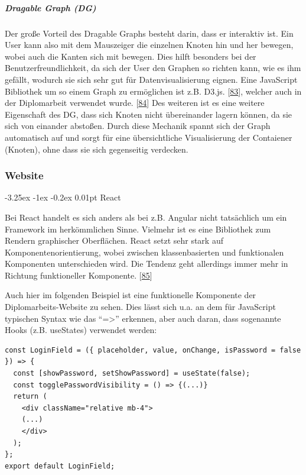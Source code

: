 \documentclass[
    headings=optiontotocandhead,%
    twoside,
    numbers=noenddot,%
    12pt, %
    titlepage, %
    parskip=full, %
    listof=leveldown, 
    numbers=noenddot, %
    a4paper,DIV=14,
    BCOR=15mm,
]{scrbook}
\makeatletter
\renewcommand\paragraph{\@startsection{paragraph}{4}{\z@}%
    {-3.25ex \@plus -1ex \@minus -0.2ex}%
    {0.01pt}%
    {\raggedsection\normalfont\sectfont\nobreak\size@paragraph}%
  }
\makeatother
\begin{document}
\hypertarget{dragable-graph-dg}{%
\subparagraph{Dragable Graph (DG)}\label{dragable-graph-dg}}

Der große Vorteil des Dragable Graphs besteht darin, dass er interaktiv
ist. Ein User kann also mit dem Mauszeiger die einzelnen Knoten hin und
her bewegen, wobei auch die Kanten sich mit bewegen. Dies hilft
besonders bei der Benutzerfreundlichkeit, da sich der User den Graphen
so richten kann, wie es ihm gefällt, wodurch sie sich sehr gut für
Datenvisualisierung eignen. Eine JavaScript Bibliothek um so einem Graph
zu ermöglichen ist z.B. D3.js.
{[}\protect\hyperlink{ref-D3js-Homepage}{83}{]}, welcher auch in der
Diplomarbeit verwendet wurde.
{[}\protect\hyperlink{ref-gpt-DragableGraph}{84}{]} Des weiteren ist es
eine weitere Eigenschaft des DG, dass sich Knoten nicht übereinander
lagern können, da sie sich von einander abstoßen. Durch diese Mechanik
spannt sich der Graph automatisch auf und sorgt für eine übersichtliche
Visualisierung der Contaiener (Knoten), ohne dass sie sich gegenseitig
verdecken.

\hypertarget{website}{%
\subsubsection{Website}\label{website}}

\hypertarget{react}{%
\paragraph{React}\label{react}}

Bei React handelt es sich anders als bei z.B. Angular nicht tatsächlich
um ein Framework im herkömmlichen Sinne. Vielmehr ist es eine Bibliothek
zum Rendern graphischer Oberflächen. React setzt sehr stark auf
Komponentenorientierung, wobei zwischen klassenbasierten und
funktionalen Komponenten unterschieden wird. Die Tendenz geht allerdings
immer mehr in Richtung funktioneller Komponente.
{[}\protect\hyperlink{ref-Heise-React}{85}{]}

Auch hier im folgenden Beispiel ist eine funktionelle Komponente der
Diplomarbeits-Website zu sehen. Dies lässt sich u.a. an dem für
JavaScript typischen Syntax wie das ``=\textgreater{}'' erkennen, aber
auch daran, dass sogenannte Hooks (z.B. useStates) verwendet werden:

\begin{lstlisting}[caption={Beispiel funktionelle Komponente LoginField}]
const LoginField = ({ placeholder, value, onChange, isPassword = false }) => {
  const [showPassword, setShowPassword] = useState(false);
  const togglePasswordVisibility = () => {(...)}
  return (
    <div className="relative mb-4"> 
    (...)
    </div>
  );
};
export default LoginField;
\end{lstlisting}
\end{document}
